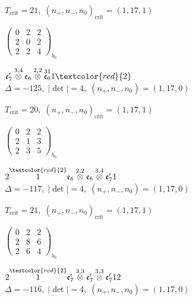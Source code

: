 \documentclass[10pt]{article}
\begin{document}
\hspace{1em}$T_{\text{crit}}=21,\; (n_+,n_-,n_0)_{\text{crit}}=(1,17,1)$

\hspace{2em}$\left(\begin{smallmatrix}0 & 2 & 2 \\ 2 & 0 & 2 \\ 2 & 2 & 4\end{smallmatrix}\right)_{\!b_0}$

\smallskip

$\mathfrak{e}_7'\overset{3,4}{\otimes}\mathfrak{e}_6\overset{2,2}{\otimes}\overset{31}{\mathfrak{e}_6}1\textcolor{red}{2}$ \quad $\Delta=-125,\; |\det|=4,\; (n_+,n_-,n_0)=(1,17,0)$

\hspace{1em}$T_{\text{crit}}=20,\; (n_+,n_-,n_0)_{\text{crit}}=(1,17,1)$

\hspace{2em}$\left(\begin{smallmatrix}0 & 2 & 2 \\ 2 & 1 & 3 \\ 2 & 3 & 5\end{smallmatrix}\right)_{\!b_0}$

\smallskip

$2\overset{\textcolor{red}{2}}{1}\mathfrak{e}_6\overset{2,2}{\otimes}\mathfrak{e}_6\overset{3,4}{\otimes}\mathfrak{e}_7'1$ \quad $\Delta=-117,\; |\det|=4,\; (n_+,n_-,n_0)=(1,17,0)$

\hspace{1em}$T_{\text{crit}}=21,\; (n_+,n_-,n_0)_{\text{crit}}=(1,17,1)$

\hspace{2em}$\left(\begin{smallmatrix}0 & 2 & 2 \\ 2 & 8 & 6 \\ 2 & 6 & 4\end{smallmatrix}\right)_{\!b_0}$

\smallskip

$2\overset{\textcolor{red}{2}}{1}\mathfrak{e}_7'\overset{3,3}{\otimes}\mathfrak{e}_7'\overset{3,3}{\otimes}\mathfrak{e}_7'12$ \quad $\Delta=-116,\; |\det|=4,\; (n_+,n_-,n_0)=(1,17,0)$
\end{document}
